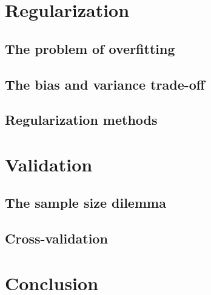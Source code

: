 \section{Regularization}

\subsection{The problem of overfitting}

\subsection{The bias and variance trade-off}

\subsection{Regularization methods}

\section{Validation}

\subsection{The sample size dilemma}

\subsection{Cross-validation}

\section{Conclusion}


